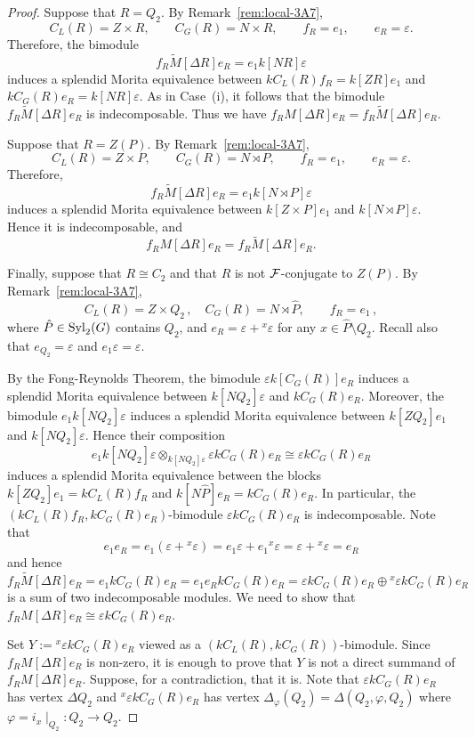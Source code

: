 \begin{proof}
\medskip
{} Suppose that $R=Q_2$. By Remark~\ref{rem:local-3A7},
\[
C_L(R)=Z\times R,\qquad C_G(R)=N\times R,
\qquad f_R=e_1,\qquad e_R=\varepsilon.
\]
Therefore, the bimodule
\[
f_R\widetilde{M}[\Delta R]e_R=e_1k[NR]\varepsilon
\]
induces a splendid Morita equivalence between $kC_L(R)f_R=k[ZR]e_1$ and $kC_G(R)e_R=k[NR]\varepsilon$. As in Case~{\rm (i)}, it follows that the bimodule $f_R\widetilde{M}[\Delta R]e_R$ is indecomposable. Thus we have $f_RM[\Delta R]e_R=f_R\widetilde{M}[\Delta R]e_R$.

\medskip
{} Suppose that $R=Z(P)$. By Remark~\ref{rem:local-3A7},
\[
C_L(R)=Z\times P,\qquad C_G(R)=N\rtimes P,
\qquad f_R=e_1,\qquad e_R=\varepsilon.
\]
Therefore,
\[
f_R\widetilde{M}[\Delta R]e_R=e_1k[N\rtimes P]\varepsilon
\]
induces a splendid Morita equivalence between
$k[Z\times P]e_1$ and $k[N\rtimes P]\varepsilon$.
Hence it is indecomposable, and
\[
f_RM[\Delta R]e_R
   =f_R\widetilde{M}[\Delta R]e_R.
\]


\medskip
{} Finally, suppose that $R\cong C_2$ and that $R$ is  not $\mathcal{F}$-conjugate to $Z(P)$. By Remark~\ref{rem:local-3A7},
\[
C_L(R)=Z\times Q_2\,,\quad C_G(R)=N\rtimes \hat{P},\qquad f_R=e_1\,,
\]
where $\hat{P}\in \operatorname{Syl}_2(G)$ contains $Q_2$, and $e_R=\varepsilon+{}^{x}\varepsilon$ for any $x\in \hat{P}\setminus Q_2$. Recall also that $e_{Q_2}=\varepsilon$ and $e_1\varepsilon=\varepsilon$. 

By the Fong-Reynolds Theorem, the bimodule $\varepsilon k[C_G(R)]e_R$ induces a splendid Morita equivalence between $k[NQ_2]\varepsilon$ and $kC_G(R)e_R$. Moreover, the bimodule $e_1k[NQ_2]\varepsilon$ induces a splendid Morita equivalence between $k[ZQ_2]e_1$ and $k[NQ_2]\varepsilon$. Hence their composition
\[
e_1k[NQ_2]\varepsilon\otimes_{k[NQ_2]\varepsilon}\varepsilon kC_G(R)e_R\cong \varepsilon kC_G(R)e_R
\]
induces a splendid Morita equivalence between the blocks $k[ZQ_2]e_1=kC_L(R)f_R$ and $k[N\hat{P}]e_R=kC_G(R)e_R$. In particular, the $(kC_L(R)f_R, kC_G(R)e_R)$-bimodule $\varepsilon kC_G(R)e_R$ is indecomposable. Note that
\[
e_1e_R=e_1(\varepsilon+{}^{x}\varepsilon)=e_1\varepsilon+e_1{}^{x}\varepsilon=\varepsilon+{}^{x}\varepsilon=e_R
\]
and hence
\[
f_R\widetilde{M}[\Delta R]e_R=e_1kC_G(R)e_R=e_1e_RkC_G(R)e_R=\varepsilon kC_G(R)e_R\oplus {}^{x}\varepsilon kC_G(R)e_R
\]
is a sum of two indecomposable modules. We need to show that $f_RM[\Delta R]e_R\cong \varepsilon kC_G(R)e_R$.

Set $Y:={}^{x}\varepsilon kC_G(R)e_R$ viewed as a $(kC_L(R),kC_G(R))$-bimodule. Since $f_RM[\Delta R]e_R$ is non-zero, it is enough to prove that $Y$ is not a direct summand of $f_RM[\Delta R]e_R$. Suppose, for a contradiction, that it is. Note that $\varepsilon kC_G(R)e_R$ has vertex $\Delta Q_2$ and ${}^{x}\varepsilon kC_G(R)e_R$ has vertex $\Delta_\varphi(Q_2)=\Delta(Q_2, \varphi, Q_2)$ where $\varphi=i_x\mid_{Q_2}:Q_2\longrightarrow Q_2$. 


\end{proof}
